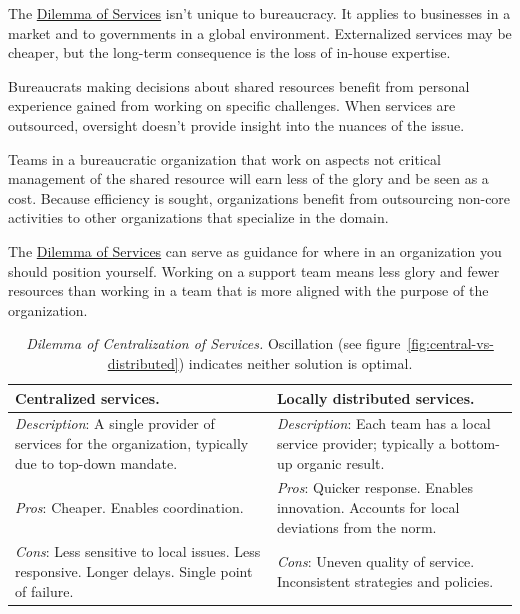The \hyperref[table:dilemma-org-inhouse-vs-external]{Dilemma of Services} isn't unique to bureaucracy. It applies to businesses in a market and to governments in a global environment. Externalized services may be cheaper, but the long-term consequence is the loss of in-house expertise. 


Bureaucrats making decisions about shared resources benefit from personal experience gained from working on specific challenges. 
When services are outsourced, oversight doesn't provide insight into the nuances of the issue.

Teams in a bureaucratic organization that work on aspects not critical management of the shared resource will earn less of the glory and be seen as a cost. Because efficiency is sought, organizations benefit from outsourcing non-core activities to other organizations that specialize in the domain.

The \hyperref[table:dilemma-org-inhouse-vs-external]{Dilemma of Services} can serve as guidance for where in an organization you should position yourself. Working on a support team means less glory and fewer resources than working in a team that is more aligned with the purpose of the organization.



\begin{center}
\begin{table}[H] %
\begin{tabular}{ | m{\dilemmatablewidth}| m{\dilemmatablewidth} | } 
  \hline
  \textbf{Centralized services.} &
  \textbf{Locally distributed services.} \\
  \hline
  \textit{Description}: A single provider of services for the organization, typically due to top-down mandate. &
  \textit{Description}: Each team has a local service provider; typically a bottom-up organic result. \\  
  \hline
  \textit{Pros}: Cheaper. Enables coordination. &
  \textit{Pros}: Quicker response. 
  Enables innovation. 
  Accounts for local deviations from the norm. \\
  \hline
  \textit{Cons}: Less sensitive to local issues. Less responsive. Longer delays. Single point of failure.  & 
  \textit{Cons}: Uneven quality of service. Inconsistent strategies and policies. \\
  \hline
\end{tabular}
\caption{
\textit{Dilemma of Centralization of Services.}
Oscillation (see figure~\ref{fig:central-vs-distributed}) indicates neither solution is optimal.
}
\label{table:dilemma-org-central-vs-distributed}
\end{table}
\end{center}

